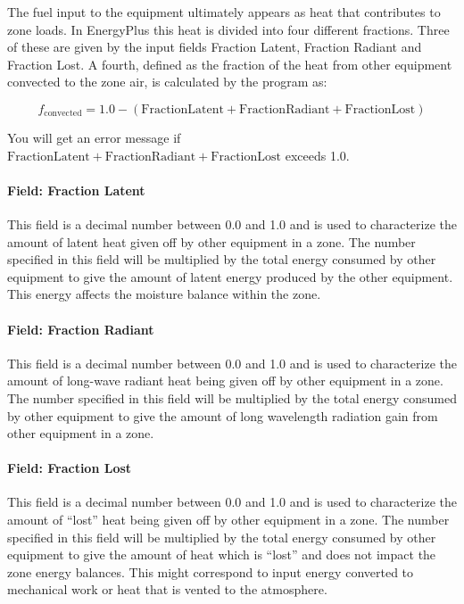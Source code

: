 The fuel input to the equipment ultimately appears as heat that contributes to zone loads. In EnergyPlus this heat is divided into four different fractions. Three of these are given by the input fields Fraction Latent, Fraction Radiant and Fraction Lost. A fourth, defined as the fraction of the heat from other equipment convected to the zone air, is calculated by the program as:

\begin{equation}
  f_{\mathrm{convected}} = 1.0 - (\mathrm{Fraction Latent} + \mathrm{Fraction Radiant} + \mathrm{Fraction Lost})
\end{equation}

You will get an error message if \(\mathrm{Fraction Latent} + \mathrm{Fraction Radiant} + \mathrm{Fraction Lost}\) exceeds 1.0.

\paragraph{Field: Fraction Latent}\label{field-fraction-latent-4-other-definition}

This field is a decimal number between 0.0 and 1.0 and is used to characterize the amount of latent heat given off by other equipment in a zone. The number specified in this field will be multiplied by the total energy consumed by other equipment to give the amount of latent energy produced by the other equipment. This energy affects the moisture balance within the zone.

\paragraph{Field: Fraction Radiant}\label{field-fraction-radiant-6-other-definition}

This field is a decimal number between 0.0 and 1.0 and is used to characterize the amount of long-wave radiant heat being given off by other equipment in a zone. The number specified in this field will be multiplied by the total energy consumed by other equipment to give the amount of long wavelength radiation gain from other equipment in a zone.

\paragraph{Field: Fraction Lost}\label{field-fraction-lost-4-other-definition}

This field is a decimal number between 0.0 and 1.0 and is used to characterize the amount of ``lost'' heat being given off by other equipment in a zone. The number specified in this field will be multiplied by the total energy consumed by other equipment to give the amount of heat which is ``lost'' and does not impact the zone energy balances. This might correspond to input energy converted to mechanical work or heat that is vented to the atmosphere.

